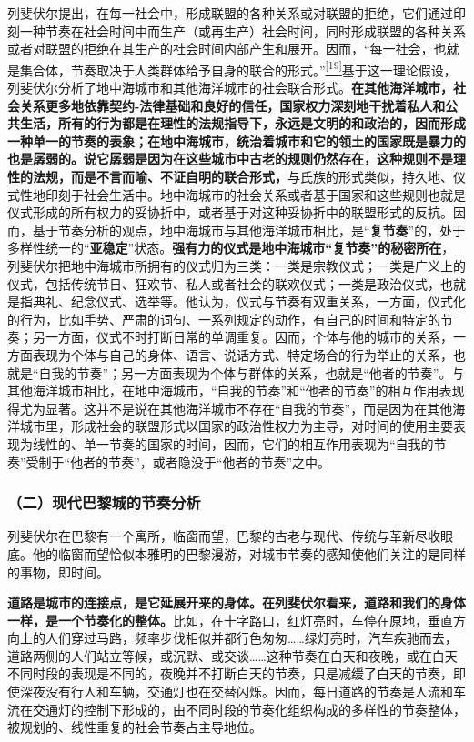 \documentclass[UTF8, fontset = sourcesans, a4paper, oneside, zihao =
-4, scheme=chinese, no-math, space=true]{ctexbook}
\begin{document}
列斐伏尔提出，在每一社会中，形成联盟的各种关系或对联盟的拒绝，它们通过印刻一种节奏在社会时间中而生产（或再生产）社会时间，同时形成联盟的各种关系或者对联盟的拒绝在其生产的社会时间内部产生和展开。因而，``每一社会，也就是集合体，节奏取决于人类群体给予自身的联合的形式。''\protect\hypertarget{part0009_split_002.htmlux5cux23w19}{}{}\protect\hyperlink{part0009_split_004.htmlux5cux23m19}{\textsuperscript{{[}19{]}}}基于这一理论假设，列斐伏尔分析了地中海城市和其他海洋城市的社会联合形式。\textbf{在其他海洋城市，社会关系更多地依靠契约-法律基础和良好的信任，国家权力深刻地干扰着私人和公共生活，所有的行为都是在理性的法规指导下，永远是文明的和政治的，因而形成一种单一的节奏的表象；在地中海城市，统治着城市和它的领土的国家既是暴力的也是孱弱的。说它孱弱是因为在这些城市中古老的规则仍然存在，这种规则不是理性的法规，而是不言而喻、不证自明的联合形式，}与氏族的形式类似，持久地、仪式性地印刻于社会生活中。地中海城市的社会关系或者基于国家和这些规则也就是仪式形成的所有权力的妥协折中，或者基于对这种妥协折中的联盟形式的反抗。因而，基于节奏分析的观点，地中海城市与其他海洋城市相比，是``\textbf{复节奏}''的，处于多样性统一的``\textbf{亚稳定}''状态。\textbf{强有力的仪式是地中海城市``复节奏''的秘密所在}，列斐伏尔把地中海城市所拥有的仪式归为三类：一类是宗教仪式；一类是广义上的仪式，包括传统节日、狂欢节、私人或者社会的联欢仪式；一类是政治仪式，也就是指典礼、纪念仪式、选举等。他认为，仪式与节奏有双重关系，一方面，仪式化的行为，比如手势、严肃的词句、一系列规定的动作，有自己的时间和特定的节奏；另一方面，仪式不时打断日常的单调重复。因而，个体与他的城市的关系，一方面表现为个体与自己的身体、语言、说话方式、特定场合的行为举止的关系，也就是``自我的节奏''；另一方面表现为个体与群体的关系，也就是``他者的节奏''。与其他海洋城市相比，在地中海城市，``自我的节奏''和``他者的节奏''的相互作用表现得尤为显著。这并不是说在其他海洋城市不存在``自我的节奏''，而是因为在其他海洋城市里，形成社会的联盟形式以国家的政治性权力为主导，对时间的使用主要表现为线性的、单一节奏的国家的时间，因而，它们的相互作用表现为``自我的节奏''受制于``他者的节奏''，或者隐没于``他者的节奏''之中。

\subsubsection{（二）现代巴黎城的节奏分析}\label{part0009_split_002.htmlux5cux23d034}

列斐伏尔在巴黎有一个寓所，临窗而望，巴黎的古老与现代、传统与革新尽收眼底。他的临窗而望恰似本雅明的巴黎漫游，对城市节奏的感知使他们关注的是同样的事物，即时间。

\textbf{道路是城市的连接点，是它延展开来的身体。在列斐伏尔看来，道路和我们的身体一样，是一个节奏化的整体。}比如，在十字路口，红灯亮时，车停在原地，垂直方向上的人们穿过马路，频率步伐相似并都行色匆匆……绿灯亮时，汽车疾驰而去，道路两侧的人们站立等候，或沉默、或交谈……这种节奏在白天和夜晚，或在白天不同时段的表现是不同的，夜晚并不打断白天的节奏，只是减缓了白天的节奏，即使深夜没有行人和车辆，交通灯也在交替闪烁。因而，每日道路的节奏是人流和车流在交通灯的控制下形成的，由不同时段的节奏化组织构成的多样性的节奏整体，被规划的、线性重复的社会节奏占主导地位。
\end{document}

